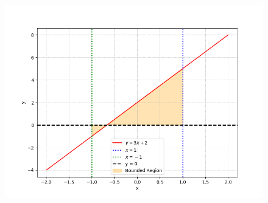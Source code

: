 \documentclass[journal]{IEEEtran}
\begin{document}
\begin{enumerate}
\begin{figure}[h]
    \centering
    \includegraphics[width=\columnwidth]{figs/fig.png}
 \end{figure}

\end{enumerate}
\end{document}

